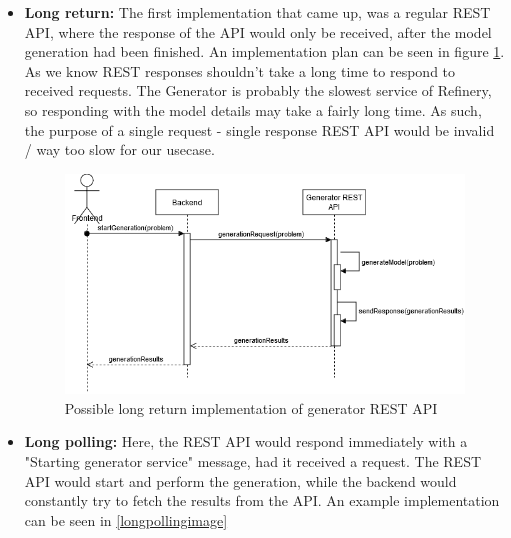 \begin{itemize}
        \item \textbf{Long return:}
		The first implementation that came up, was a regular REST API, where the response of the API would only be received, after
		the model generation had been finished. An implementation plan can be seen in figure \ref{longreturnimage}. 
		As we know REST responses shouldn't take a long time to respond to received requests.
		The Generator is probably the slowest service of Refinery, so responding with the model details may take a fairly long time.
		As such, the purpose of a single request - single response REST API would be invalid / way too slow for our usecase.
		\begin{figure}
			\begin{center}
				\includegraphics[scale=0.6]{include/imgs/rest_long_return.png}
				\caption{Possible long return implementation of generator REST API}
				\label{longreturnimage}
			\end{center}
		\end{figure}
		\item \textbf{Long polling:}
		Here, the REST API would respond immediately with a "Starting generator service" message, had it received a request.
		The REST API would start and perform the generation, while the backend would constantly try to fetch the results from the API.
		An example implementation can be seen in \ref{longpollingimage}
		\begin{figure}
			\begin{center}

\end{center}
\end{figure}
\end{itemize}

